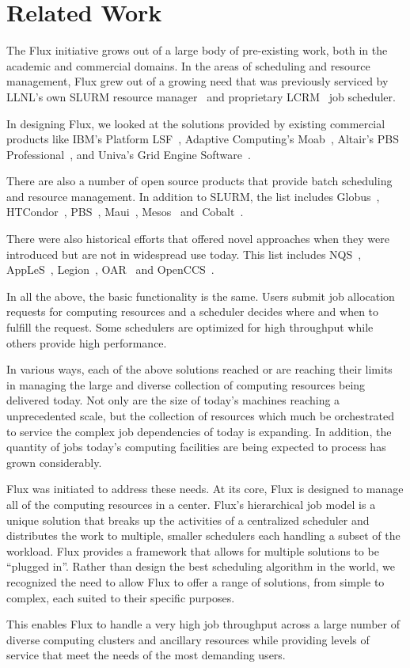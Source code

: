 \section{Related Work}

The Flux initiative grows out of a large body of pre-existing work,
both in the academic and commercial domains.  In the areas of
scheduling and resource management, Flux grew out of a growing need
that was previously serviced by LLNL's own SLURM resource
manager~\cite{Jette02slurm} and proprietary LCRM~\cite{LCRM} job
scheduler.

In designing Flux, we looked at the solutions provided by existing
commercial products like IBM's Platform LSF~\cite{LSF}, Adaptive
Computing's Moab~\cite{MOAB}, Altair's PBS Professional~\cite{PSBPro},
and Univa's Grid Engine Software~\cite{UnivaGE}.

There are also a number of open source products that provide batch
scheduling and resource management.  In addition to SLURM, the list
includes Globus~\cite{GlobusToolkit},
HTCondor~\cite{Litzkow88,Raman98}, PBS~\cite{PBS},
Maui~\cite{Jackson01corealgorithms}, Mesos~\cite{Mesos} and
Cobalt~\cite{Cobalt}.

There were also historical efforts that offered novel approaches when
they were introduced but are not in widespread use today.  This list
includes NQS~\cite{NQS}, AppLeS~\cite{AppLeS},
Legion~\cite{LegionRM,LegionGrid}, OAR~\cite{Oar} and
OpenCCS~\cite{Keller98ccsresource}.

In all the above, the basic functionality is the same.  Users submit
job allocation requests for computing resources and a scheduler
decides where and when to fulfill the request.  Some schedulers are
optimized for high throughput while others provide high performance.

In various ways, each of the above solutions reached or are reaching
their limits in managing the large and diverse collection of computing
resources being delivered today.  Not only are the size of today's
machines reaching a unprecedented scale, but the collection of
resources which much be orchestrated to service the complex job
dependencies of today is expanding.  In addition, the quantity of jobs
today's computing facilities are being expected to process has grown
considerably.

Flux was initiated to address these needs.  At its core, Flux is
designed to manage all of the computing resources in a center.  Flux's
hierarchical job model is a unique solution that breaks up the
activities of a centralized scheduler and distributes the work to
multiple, smaller schedulers each handling a subset of the workload.
Flux provides a framework that allows for multiple solutions to be
``plugged in''.  Rather than design the best scheduling algorithm in
the world, we recognized the need to allow Flux to offer a range of
solutions, from simple to complex, each suited to their specific
purposes.

This enables Flux to handle a very high job throughput across a large
number of diverse computing clusters and ancillary resources while
providing levels of service that meet the needs of the most demanding
users.
